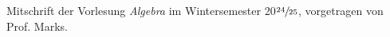 \documentclass[12pt,a4paper]{article}
\theoremstyle{definition}
\theoremstyle{plain}
\begin{document}
	\setcounter{section}{-1}
	
	
	Mitschrift der Vorlesung \textit{Algebra} im Wintersemester 20$\sfrac{24}{25}$, vorgetragen von Prof. Marks. 
	
	\tableofcontents
	
	
	

	
	
	
	
	
	
	
	
	
	
	
	
	
	
\end{document}
